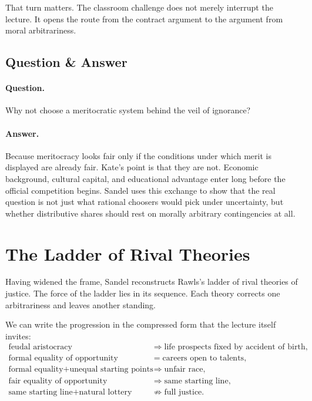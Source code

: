 That turn matters. The classroom challenge does not merely interrupt the lecture. It opens the route from the contract argument to the argument from moral arbitrariness.

\subsection{Question \& Answer}

\paragraph{Question.} Why not choose a meritocratic system behind the veil of ignorance?

\paragraph{Answer.} Because meritocracy looks fair only if the conditions under which merit is displayed are already fair. Kate's point is that they are not. Economic background, cultural capital, and educational advantage enter long before the official competition begins. Sandel uses this exchange to show that the real question is not just what rational choosers would pick under uncertainty, but whether distributive shares should rest on morally arbitrary contingencies at all.

\section{The Ladder of Rival Theories}

Having widened the frame, Sandel reconstructs Rawls's ladder of rival theories of justice. The force of the ladder lies in its sequence. Each theory corrects one arbitrariness and leaves another standing.

We can write the progression in the compressed form that the lecture itself invites:
\begin{align}
\text{feudal aristocracy} &\Longrightarrow \text{life prospects fixed by accident of birth},\\
\text{formal equality of opportunity} &= \text{careers open to talents},\\
\text{formal equality}+\text{unequal starting points} &\Longrightarrow \text{unfair race},\\
\text{fair equality of opportunity} &\Longrightarrow \text{same starting line},\\
\text{same starting line}+\text{natural lottery} &\not\Longrightarrow \text{full justice}.
\end{align}


